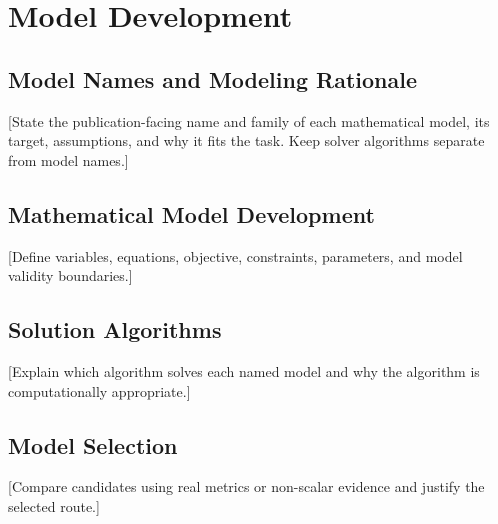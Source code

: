 \section{Model Development}
\subsection{Model Names and Modeling Rationale}
[State the publication-facing name and family of each mathematical model, its target, assumptions, and why it fits the task. Keep solver algorithms separate from model names.]
\subsection{Mathematical Model Development}
[Define variables, equations, objective, constraints, parameters, and model validity boundaries.]
\subsection{Solution Algorithms}
[Explain which algorithm solves each named model and why the algorithm is computationally appropriate.]
\subsection{Model Selection}
[Compare candidates using real metrics or non-scalar evidence and justify the selected route.]
